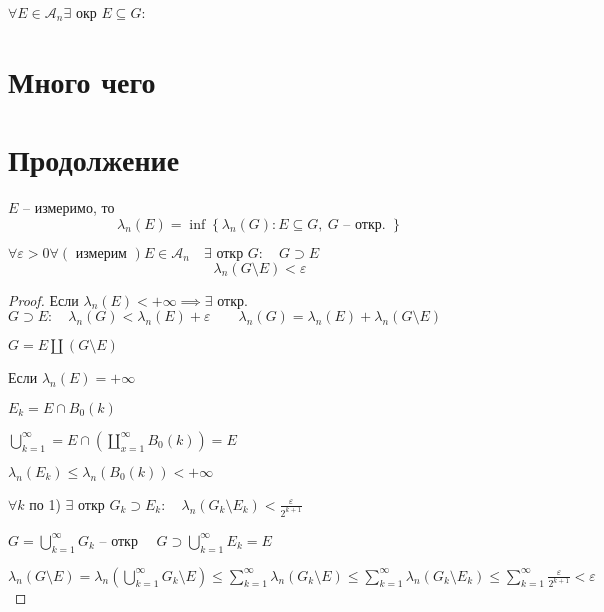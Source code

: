 \documentclass{book}
\theoremstyle{definition}
\begin{document}
\begin{statement}
    $\forall E \in \mathcal A_n \exists $ окр $E \subseteq G$: 
\end{statement}

\section{Много чего}

\section{Продолжение}

 \begin{statement}
     $E$ -- измеримо, то \[\lambda_n(E) = \inf \left\{ \lambda_n(G): E\subseteq G, \ G \text{ -- откр. } \right\} \]
\end{statement}

\begin{corollary}
    $\forall \varepsilon>0 \forall \left( \text{ измерим } \right) E \in \mathcal A_n\quad \exists  \text{ откр } G:\quad G \supset E$ \[\lambda_n\left( G \setminus E \right) <\varepsilon\]
\end{corollary}

\begin{proof}
    Если $\lambda_n(E) <  + \infty  \implies  \exists $ откр. $G \supset E:\quad \lambda_n(G) < \lambda_n(E) + \varepsilon\qquad \lambda_n(G) = \lambda_n(E) + \lambda_n(G \setminus  E)$

    $G = E \coprod \left( G \setminus E \right) $

    Если $\lambda_n(E) = +\infty $

    $E_k = E \cap B_0\left( k \right) $

    $\bigcup\limits_{k=1} ^{\infty } = E \cap \left( \coprod\limits_{x = 1}^{\infty } B_0(k) \right)  = E$

    $\lambda_n\left( E_k \right) \leqslant \lambda_n\left( B_0\left( k \right)  \right)<+\infty  $

    $\forall k$ по 1) $\exists $ откр $G_k \supset E_k: \quad \lambda_n\left( G_k \setminus  E_k \right) < \frac{\varepsilon}{2^{k+1}}$

    $G = \bigcup\limits_{k=1}^{\infty }G_k $ -- откр $\quad G \supset \bigcup\limits_{k=1}^{\infty } E_k = E $ 

    $\lambda_n\left( G \setminus  E \right)  = \lambda_n\left( \bigcup\limits_{k=1} ^{\infty }G_k \setminus  E \right) \leqslant \sum_{k=1}^{\infty } \lambda_n\left( G_k\setminus E \right) \leqslant \sum_{k=1}^{\infty } \lambda_n\left( G_k \setminus  E_k \right) \leqslant \sum_{k=1}^{\infty } \frac{\varepsilon}{2^{k+1}}<\varepsilon$
\end{proof}
\end{document}
